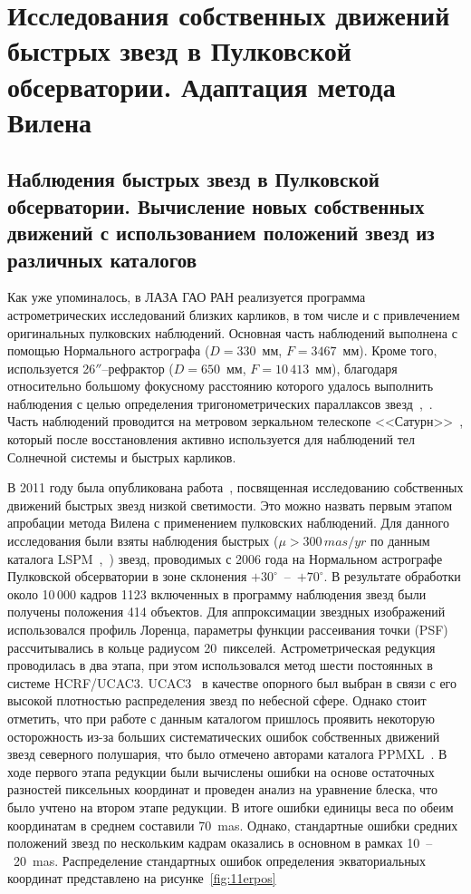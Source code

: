 \chapter{Исследования собственных движений быстрых звезд в Пулковcкой обсерватории. Адаптация метода Вилена} \label{ch:ch3}
\section{Наблюдения быстрых звезд в Пулковской обсерватории. Вычисление новых собственных движений с использованием положений звезд из различных каталогов} \label{sec:ch3/sect1}
Как уже упоминалось, в ЛАЗА ГАО РАН  реализуется программа астрометрических исследований близких карликов, в том числе и с привлечением оригинальных пулковских наблюдений. Основная часть наблюдений выполнена с помощью Нормального астрографа ($D=330$~мм, $F=3467$~мм).  Кроме того, используется  26$''$--рефрактор ($D=650$~мм, $F=10\,413$~мм), благодаря относительно большому фокусному расстоянию которого удалось выполнить наблюдения с целью определения тригонометрических параллаксов звезд~\cite{2010AstL...36..576K},~\cite{2013MNRAS.435.1083K}. Часть наблюдений проводится на метровом зеркальном телескопе <<Сатурн>>~\cite{2015arXiv151101642K}, который после восстановления активно используется для наблюдений тел Солнечной системы и быстрых карликов.

В 2011 году была опубликована работа~\cite{2011AstL...37..420K}, посвященная исследованию собственных движений быстрых звезд низкой светимости. Это можно назвать первым этапом апробации метода Вилена с применением пулковских наблюдений. Для данного исследования были взяты наблюдения быстрых ($\mu>300\,mas/yr$ по данным каталога LSPM~\cite{2005AJ....129.1483L},~\cite{2008IAUS..248...74L}) звезд, проводимых с 2006 года на Нормальном астрографе Пулковской обсерватории в зоне склонения $+30^{\circ}$~--~$+70^{\circ}$. В результате обработки около 10\,000 кадров 1123 включенных в программу наблюдения звезд были получены положения 414 объектов. Для аппроксимации звездных изображений использовался профиль Лоренца, параметры функции рассеивания точки (PSF) рассчитывались в кольце радиусом 20~пикселей. Астрометрическая редукция проводилась в два этапа, при этом использовался метод шести постоянных в системе  HCRF/UCAC3. UCAC3~\cite{2010AJ....139.2184Z} в качестве опорного был выбран в связи с его высокой плотностью распределения звезд по небесной сфере. Однако стоит отметить, что при работе с данным каталогом пришлось проявить некоторую осторожность из-за больших систематических ошибок собственных движений звезд северного полушария, что было отмечено авторами  каталога PPMXL~\cite{2010AJ....139.2440R}. В ходе первого этапа редукции были вычислены ошибки на основе остаточных разностей пиксельных координат и проведен анализ на уравнение блеска, что было учтено на втором этапе редукции. В итоге ошибки единицы веса по обеим координатам в среднем составили 70~mas. Однако, стандартные ошибки средних положений звезд по нескольким кадрам оказались в основном в рамках 10~--~20~mas. Распределение стандартных ошибок определения экваториальных координат представлено на рисунке~\ref{fig:11erpos}

